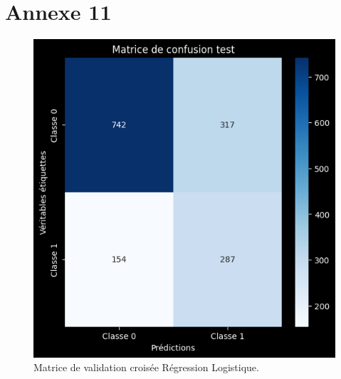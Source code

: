 \section*{Annexe 11}
\label{sec:annexe11}
\begin{figure}[H]
\centering
\includegraphics[width=1\textwidth]{figures/MatriceValANNEXE11.png}
\caption{Matrice de validation croisée Régression Logistique.}
\label{fig:annexe11}
\end{figure}
